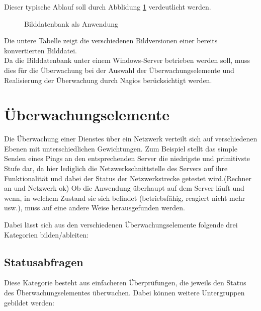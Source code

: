 Dieser typische Ablauf soll durch Abblidung \ref{bdbanw} verdeutlicht werden.
\begin{figure}[ht]
	\centering
		\caption{Bilddatenbank als Anwendung}
		\label{bdbanw}
\end{figure}

Die untere Tabelle zeigt die verschiedenen Bildversionen einer bereits konvertierten Bilddatei.\\

Da die Bilddatenbank unter einem Windows-Server betrieben werden soll, muss dies für die Überwachung bei der Auswahl der Überwachungselemente und Realisierung der Überwachung durch Nagios berücksichtigt werden.

\newpage
\section{Überwachungselemente}
Die Überwachung einer Dienstes über ein Netzwerk verteilt sich auf verschiedenen Ebenen mit unterschiedlichen Gewichtungen.
Zum Beispiel stellt das simple Senden eines Pings an den entsprechenden Server die niedrigste und primitivste Stufe dar, da hier lediglich die Netzwerkschnittstelle des Servers auf ihre Funktionalität und dabei der Status der Netzwerkstrecke getestet wird.(Rechner an und Netzwerk ok)
Ob die Anwendung überhaupt auf dem Server läuft und wenn, in welchem Zustand sie sich befindet (betriebsfähig, reagiert nicht mehr usw.), muss auf eine andere Weise herausgefunden werden.

Dabei lässt sich aus den verschiedenen Überwachungselemente folgende drei Kategorien bilden/ableiten:

\subsection{Statusabfragen}
\label{syschecks}
Diese Kategorie besteht aus einfacheren Überprüfungen, die jeweils den Status des Überwachungselementes überwachen.
Dabei können weitere Untergruppen gebildet werden:

